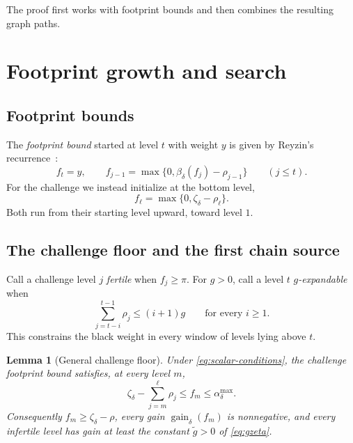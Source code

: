 \documentclass[11pt]{article}
\theoremstyle{plain}
\newtheorem{lemma}{Lemma}
\theoremstyle{remark}
\newcommand{\gaind}{\operatorname{gain}_{\delta}}
\newcommand{\gtilde}{\widetilde g}
\newcommand{\spend}[2]{\sum_{j=#1}^{#2}\rho_j}
\begin{document}
The proof first works with footprint bounds and then combines the resulting graph
paths.

\section{Footprint growth and search}
\label{sec:footprint-proof}
\subsection{Footprint bounds}

The \emph{footprint bound} started at level \(t\) with weight \(y\) is given by
Reyzin's recurrence~\cite{FOCS:Reyzin24}:
\begin{equation}
 f_t=y,\qquad
 f_{j-1}=\max\{0,\beta_\delta(f_j)-\rho_{j-1}\}\qquad(j\le t).
 \label{eq:footprint-bound}
\end{equation}
For the challenge we instead initialize at the bottom level,
\begin{equation}
 f_\ell=\max\{0,\zeta_\delta-\rho_\ell\}.
 \label{eq:challenge-bound}
\end{equation}
Both run from their starting level upward, toward level \(1\).

\subsection{The challenge floor and the first chain source}

Call a challenge level \(j\) \emph{fertile} when \(f_j\ge\pi\).  For \(g>0\), call
a level \(t\) \emph{\(g\)-expandable} when
\begin{equation}
 \spend{t-i}{t-1}\le(i+1)g
 \qquad\text{for every }i\ge1.
 \label{eq:expandable}
\end{equation}
This constrains the black weight in every window of levels lying above \(t\).

\begin{lemma}[General challenge floor]
\label{lem:challenge-floor}
Under \eqref{eq:scalar-conditions}, the challenge footprint bound satisfies, at
every level \(m\),
\begin{equation}
 \zeta_\delta-\spend{m}{\ell}\le f_m\le
 \alpha_\delta^{\max}.
 \label{eq:challenge-invariants}
\end{equation}
Consequently \(f_m\ge\zeta_\delta-\rho\), every gain
\(\gaind(f_m)\) is nonnegative, and every infertile level has gain at least the
constant \(\gtilde>0\) of \eqref{eq:gzeta}.
\end{lemma}
\end{document}
